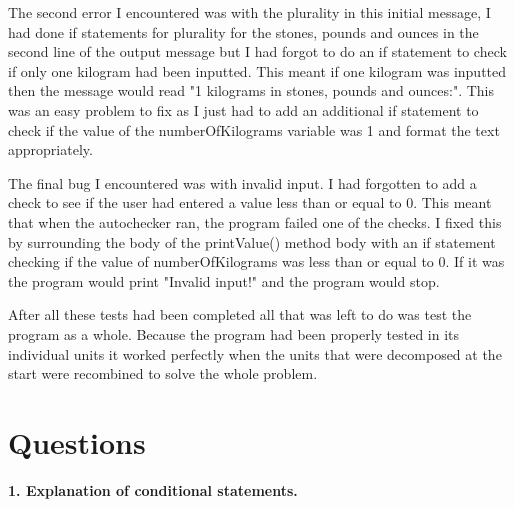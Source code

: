\documentclass[a4paper]{article}
\begin{document}
The second error I encountered was with the plurality in this initial message, I had done if statements for plurality for the stones, pounds and 
ounces in the second line of the output message but I had forgot to do an if statement to check if only one kilogram had been inputted. This meant if 
one kilogram was inputted then the message would read "1 kilograms in stones, pounds and ounces:". This was an easy problem to fix as I just had to 
add an additional if statement to check if the value of the numberOfKilograms variable was 1 and format the text appropriately.

The final bug I encountered was with invalid input. I had forgotten to add a check to see if the user had entered a value less than or equal to 0. 
This meant that when the autochecker ran, the program failed one of the checks. I fixed this by surrounding the body of the printValue() method body 
with an if statement checking if the value of numberOfKilograms was less than or equal to 0. If it was the program would print "Invalid input!" and 
the program would stop.

After all these tests had been completed all that was left to do was test the program as a whole. Because the program had been properly tested in its 
individual units it worked perfectly when the units that were decomposed at the start were recombined to solve the whole problem.

\section*{Questions}
\textbf{1. Explanation of conditional statements.}
\end{document}
